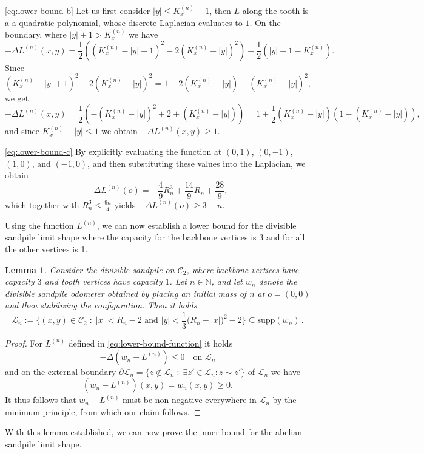 \documentclass[11pt]{article}
\newtheorem{lemma}{Lemma}[section]
\begin{document}
\ref{eq:lower-bound-b} Let us first consider $|y|\leq K_x^{(n)}-1$, then $L$ along the tooth is a a quadratic polynomial, whose discrete Laplacian evaluates to $1$. On the boundary, where $|y|+1>K_x^{(n)}$ we have
$$-\Delta L^{(n)}(x,y)=\frac{1}{2}\left((K_x^{(n)}-|y|+1)^2-2(K_x^{(n)}-|y|)^2\right)+\frac{1}{2}\left(|y|+1-K_x^{(n)}\right).$$
Since
$$(K_x^{(n)}-|y|+1)^2-2(K_x^{(n)}-|y|)^2=1+2(K_x^{(n)}-|y|)-(K_x^{(n)}-|y|)^2,$$
we get
$$-\Delta L^{(n)}(x,y)=\frac{1}{2}\left(-(K_x^{(n)}-|y|)^2+2+(K_x^{(n)}-|y|)\right)=1+\frac{1}{2}\left(K_x^{(n)}-|y|\right)\left(1-(K_x^{(n)}-|y|)\right),$$
 and since $K_x^{(n)}-|y|\leq 1$ we obtain $-\Delta L^{(n)}(x,y)\geq 1.$

 \ref{eq:lower-bound-c} 
By explicitly evaluating the function at $(0,1)$, $(0,-1)$, $(1,0)$, and $(-1,0)$, and then substituting these values into the Laplacian, we obtain
 $$-\Delta L^{(n)}(o)=-\frac{4}{9}R_n^3+\frac{14}{9}R_n+\frac{28}{9},$$
which together with 
 $R_n^{3}\leq \frac{9n}{4}$ yields  $-\Delta L^{(n)}(o)\geq 3-n$.

Using the function $L^{(n)}$, we can now establish a lower bound for the divisible sandpile limit shape where the capacity for the backbone vertices is 3 and for all the other vertices is 1.

\begin{lemma}\label{lem:lower-bound-divisible}
Consider the divisible sandpile on $\mathcal{C}_2$, where backbone vertices have capacity $3$ and tooth vertices have capacity $1$. Let $n \in \mathbb{N}$, and let $w_n$ denote the divisible sandpile odometer obtained by placing an initial mass of $n$ at $o=(0,0)$ and then stabilizing the configuration. Then it holds 
\[
\mathcal{L}_n:=\Big\{(x,y)\in\mathcal{C}_2\;:\; |x|< R_n-2\text{ and }|y|< \frac{1}{3}\big(R_n-|x|\big)^2-2\Big\}\subseteq \text{supp}(w_n)\,.
\]
\end{lemma}
\begin{proof}
    For $L^{(n)}$ defined in \eqref{eq:lower-bound-function} it holds
    $$-\Delta (w_n-L^{(n)})\leq 0 \quad \text{on } \mathcal{L}_n$$
    and on the external boundary $\partial \mathcal{L}_n=\big\{z\notin \mathcal{L}_n\; : \;\exists z'\in\mathcal{L}_n:z\sim z'\big\}$  of $\mathcal{L}_n$ we have
    $$(w_n-L^{(n)})(x,y)=w_n(x,y)\geq 0.$$
    It thus follows that $w_n-L^{(n)}$ must be non-negative everywhere in $\mathcal{L}_n$ by the minimum principle, from which our claim follows.
\end{proof}

With this lemma established, we can now prove the inner bound for the abelian sandpile limit shape.
\end{document}
